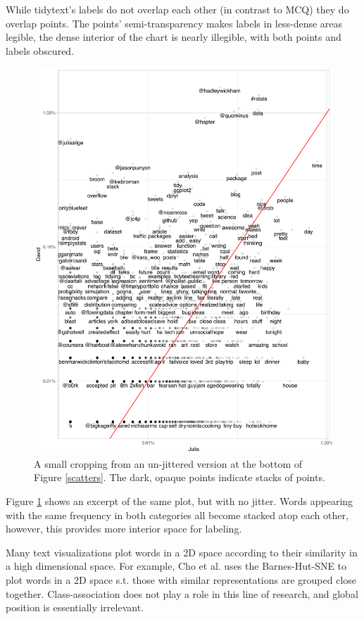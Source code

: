 \documentclass[11pt,a4paper]{article}
\begin{document}
While tidytext's labels do not overlap each other (in contrast to MCQ) they do overlap points.  The points' semi-transparency makes labels in less-dense areas legible, the dense interior of the chart is nearly illegible, with both points and labels obscured. 
\begin{figure}[h]
\vspace{-.25cm}
\includegraphics[width=\columnwidth]{tidytext_horiz}
\caption{A small cropping from an un-jittered version at the bottom of Figure \ref{scatters}.  The dark, opaque points indicate stacks of points.}
\label{nojitterfig}
\vspace{-.25cm}
\end{figure}
Figure \ref{nojitterfig} shows an excerpt of the same plot, but with no jitter.  Words appearing with the same frequency in both categories all become stacked atop each other, however, this provides more interior space for labeling. 

Many text visualizations plot words in a 2D space according to their similarity in a high dimensional space.  For example, Cho et al. \citeyear{Cho2014} uses the Barnes-Hut-SNE to plot words in a 2D space s.t. those with similar representations are grouped close together. Class-association does not play a role in this line of research, and global position is essentially irrelevant. 
\end{document}
